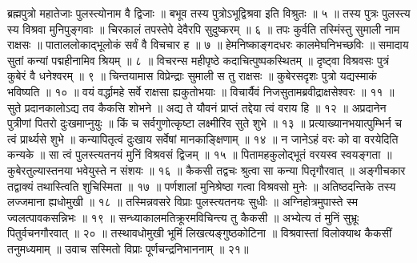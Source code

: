 ब्रह्मपुत्रो महातेजाः पुलस्त्योनाम वै द्विजाः ॥
बभूव तस्य पुत्रोऽभूद्विश्रवा इति विश्रुतः ॥ ५ ॥
तस्य पुत्रः पुलस्त्य स्य विश्रवा मुनिपुङ्गवाः ॥
चिरकालं तपस्तेपे देवैरपि सुदुष्करम् ॥ ६ ॥
तपः कुर्वति तस्मिंस्तु सुमाली नाम राक्षसः ॥
पाताललोकाद्भूलोकं सर्वं वै विचचार ह ॥ ७ ॥
हेमनिष्काङ्गदधरः कालमेघनिभच्छविः ॥
समादाय सुतां कन्यां पद्महीनामिव श्रियम् ॥ ८ ॥
विचरन्स महीपृष्ठे कदाचित्पुष्पकस्थितम् ॥
दृष्ट्वा विश्रवसः पुत्रं कुबेरं वै धनेश्वरम् ॥ ९ ॥
चिन्तयामास विप्रेन्द्राः सुमाली स तु राक्षसः ॥
कुबेरसदृशः पुत्रो यद्यस्माकं भविष्यति ॥ १० ॥
वयं वर्द्धामहे सर्वे राक्षसा ह्यकुतोभयाः ॥
विचार्यैवं निजसुतामब्रवीद्राक्षसेश्वरः ॥ ११ ॥
सुते प्रदानकालोऽद्य तव कैकसि शोभने ॥
अद्य ते यौवनं प्राप्तं तद्देया त्वं वराय हि ॥ १२ ॥
अप्रदानेन पुत्रीणां पितरो दुःखमाप्नुयुः ॥
किं च सर्वगुणोत्कृष्टा लक्ष्मीरिव सुते शुभे ॥ १३ ॥
प्रत्याख्यानभयात्पुम्भिर्न च त्वं प्रार्थ्यसे शुभे ॥
कन्यापितृत्वं दुःखाय सर्वेषां मानकाङ्क्षिणाम् ॥ १४ ॥
न जानेऽहं वरः को वा वरयेदिति कन्यके ॥
सा त्वं पुलस्त्यतनयं मुनिं विश्रवसं द्विजम् ॥ १५ ॥
पितामहकुलोद्भूतं वरयस्व स्वयङ्गता ॥
कुबेरतुल्यास्तनया भवेयुस्ते न संशयः ॥ १६ ॥
कैकसी तद्वचः श्रुत्वा सा कन्या पितृगौरवात् ॥
अङ्गीचकार तद्वाक्यं तथास्त्विति शुचिस्मिता ॥ १७ ॥
पर्णशालां मुनिश्रेष्ठा गत्वा विश्रवसो मुनेः ॥
अतिष्ठदन्तिके तस्य लज्जमाना ह्यधोमुखी ॥ १८ ॥
तस्मिन्नवसरे विप्राः पुलस्त्यतनयः सुधीः ॥
अग्निहोत्रमुपास्ते स्म ज्वलत्पावकसन्निभः ॥ १९ ॥
सन्ध्याकालमतिक्रूरमविचिन्त्य तु कैकसी ॥
अभ्येत्य तं मुनिं सुभ्रूः पितुर्वचनगौरवात् ॥ २० ॥
तस्थावधोमुखी भूमिं लिखत्यङ्गुष्ठकोटिना ॥
विश्रवास्तां विलोक्याथ कैकसीं तनुमध्यमाम् ॥
उवाच सस्मितो विप्राः पूर्णचन्द्रनिभाननाम् ॥ २१॥

